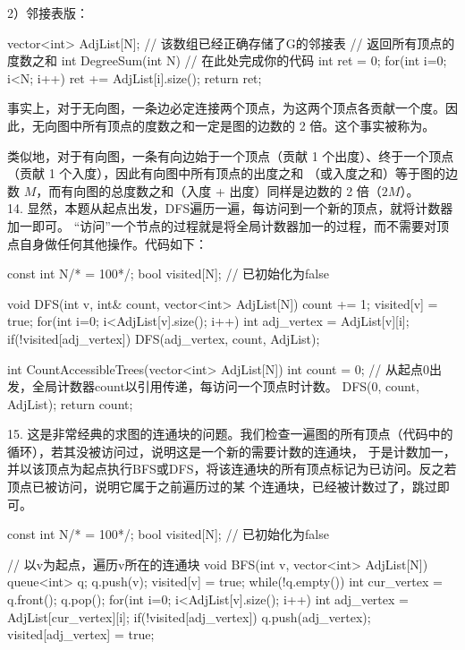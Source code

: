 \begin{exerciseanswer}
2）邻接表版：
\begin{cppcode}
    vector<int> AdjList[N]; // 该数组已经正确存储了G的邻接表
    // 返回所有顶点的度数之和
    int DegreeSum(int N) {
        // 在此处完成你的代码
        int ret = 0;
        for(int i=0; i<N; i++) {
            ret += AdjList[i].size();
        }
        return ret;
    }
\end{cppcode}

事实上，对于无向图，一条边必定连接两个顶点，为这两个顶点各贡献一个度。因此，无向图中所有顶点的度数之和一定是图的边数的 2 倍。这个事实被称为。

类似地，对于有向图，一条有向边始于一个顶点（贡献 1 个出度）、终于一个顶点（贡献 1 个入度），因此有向图中所有顶点的出度之和
（或入度之和）等于图的边数 $M$，而有向图的总度数之和（入度 + 出度）同样是边数的 2 倍（$2M$）。\\



14. 显然，本题从起点出发，DFS遍历一遍，每访问到一个新的顶点，就将计数器加一即可。
“访问”一个节点的过程就是将全局计数器加一的过程，而不需要对顶点自身做任何其他操作。代码如下：
\begin{cppcode}
    const int N/* = 100*/;
    bool visited[N];    // 已初始化为false

    void DFS(int v, int& count, vector<int> AdjList[N]) {
        count += 1;
        visited[v] = true;
        for(int i=0; i<AdjList[v].size(); i++) {
            int adj_vertex = AdjList[v][i];
            if(!visited[adj_vertex]) {
                DFS(adj_vertex, count, AdjList);
            }
        }
    }

    int CountAccessibleTrees(vector<int> AdjList[N]) {
        int count = 0;
        // 从起点0出发，全局计数器count以引用传递，每访问一个顶点时计数。
        DFS(0, count, AdjList);
        return count;
    }
\end{cppcode}

\vspace{\baselineskip}

15. 这是非常经典的求图的连通块的问题。我们检查一遍图的所有顶点（代码中的循环），若其没被访问过，说明这是一个新的需要计数的连通块，
于是计数加一，并以该顶点为起点执行BFS或DFS，将该连通块的所有顶点标记为已访问。反之若顶点已被访问，说明它属于之前遍历过的某
个连通块，已经被计数过了，跳过即可。
\begin{cppcode}
    const int N/* = 100*/;
    bool visited[N];    // 已初始化为false

    // 以v为起点，遍历v所在的连通块
    void BFS(int v, vector<int> AdjList[N]) {
        queue<int> q;
        q.push(v);
        visited[v] = true;
        while(!q.empty()) {
            int cur_vertex = q.front();
            q.pop();
            for(int i=0; i<AdjList[v].size(); i++) {
                int adj_vertex = AdjList[cur_vertex][i];
                if(!visited[adj_vertex]) {
                    q.push(adj_vertex);
                    visited[adj_vertex] = true;
                }
            }
        }
    }


\end{cppcode}
\end{exerciseanswer}
